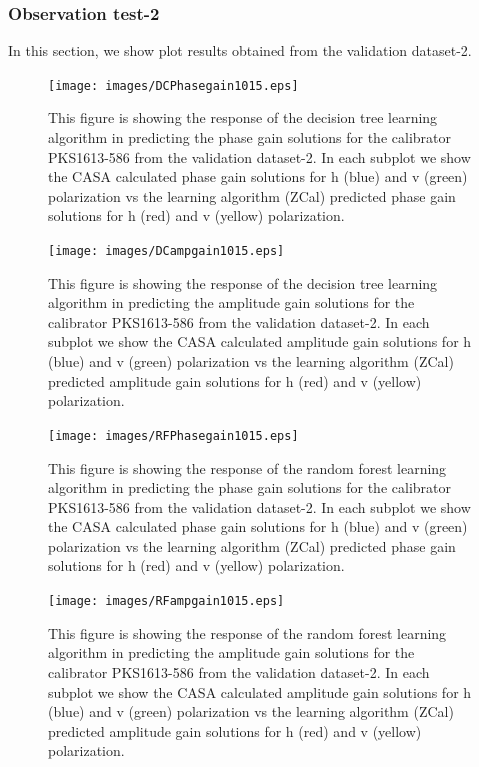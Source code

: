\subsubsection{Observation test-2}
In this section, we show plot results obtained from the validation dataset-2. 
\begin{figure}[H]
    \texttt{[image: images/DCPhasegain1015.eps]}
    \caption{This figure is showing the response of the decision tree learning algorithm in predicting the phase gain solutions for the calibrator PKS1613-586 from the validation dataset-2. In each subplot we show the CASA calculated phase gain solutions for h (blue) and v (green) polarization vs the learning algorithm (ZCal) predicted phase gain solutions for h (red) and v (yellow) polarization.}
    \label{obs5}
\end{figure}

\begin{figure}[H]
    \texttt{[image: images/DCampgain1015.eps]}
    \caption{This figure is showing the response of the decision tree learning algorithm in predicting the amplitude gain solutions for the calibrator PKS1613-586 from the validation dataset-2. In each subplot we show the CASA calculated amplitude gain solutions for h (blue) and v (green) polarization vs the learning algorithm (ZCal) predicted amplitude gain solutions for h (red) and v (yellow) polarization.}
     \label{da2}
\end{figure}


\begin{figure}[H]
    \texttt{[image: images/RFPhasegain1015.eps]}
    \caption{This figure is showing the response of the random forest learning algorithm in predicting the phase gain solutions for the calibrator PKS1613-586 from the validation dataset-2. In each subplot we show the CASA calculated phase gain solutions for h (blue) and v (green) polarization vs the learning algorithm (ZCal) predicted phase gain solutions for h (red) and v (yellow) polarization.}
    \label{obs6}
\end{figure}

\begin{figure}[H]
    \texttt{[image: images/RFampgain1015.eps]}
    \caption{This figure is showing the response of the random forest learning algorithm in predicting the amplitude gain solutions for the calibrator PKS1613-586 from the validation dataset-2. In each subplot we show the CASA calculated amplitude gain solutions for h (blue) and v (green) polarization vs the learning algorithm (ZCal) predicted amplitude gain solutions for h (red) and v (yellow) polarization.}
     \label{ra2}
\end{figure}

